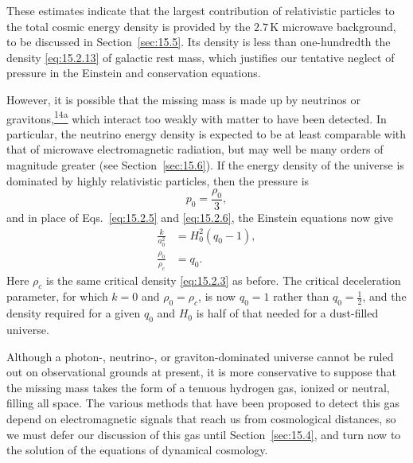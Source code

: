 These estimates indicate that the largest contribution of relativistic
particles to the total cosmic energy density is provided by the
\(2.7\,\mathrm{K}\) microwave background, to be discussed in
Section~\ref{sec:15.5}. Its density is less than one-hundredth the density
\eqref{eq:15.2.13} of galactic rest mass, which justifies our tentative
neglect of pressure in the Einstein and conservation equations.

However, it is possible that the missing mass is made up by neutrinos or
gravitons,\hyperref[ch15-ref-14a]{\textsuperscript{14a}} which interact too
weakly with matter to have been detected. In particular, the neutrino energy
density is expected to be at least comparable with that of microwave
electromagnetic radiation, but may well be many orders of magnitude greater
(see Section~\ref{sec:15.6}). If the energy density of the universe is
dominated by highly relativistic particles, then the pressure is
\begin{equation}
  p_0=\frac{\rho_0}{3},
  \tag{15.2.16}\label{eq:15.2.16}
\end{equation}
and in place of Eqs.~\eqref{eq:15.2.5} and \eqref{eq:15.2.6}, the Einstein
equations now give
\begin{align}
  \frac{k}{a_0^2}
  &=H_0^2(q_0-1),
  \tag{15.2.17}\label{eq:15.2.17}\\
  \frac{\rho_0}{\rho_c}
  &=q_0.
  \tag{15.2.18}\label{eq:15.2.18}
\end{align}
Here \(\rho_c\) is the same critical density \eqref{eq:15.2.3} as before.
The critical deceleration parameter, for which \(k=0\) and
\(\rho_0=\rho_c\), is now \(q_0=1\) rather than \(q_0=\tfrac12\), and the
density required for a given \(q_0\) and \(H_0\) is half of that needed for
a dust-filled universe.

Although a photon-, neutrino-, or graviton-dominated universe cannot be ruled
out on observational grounds at present, it is more conservative to suppose
that the missing mass takes the form of a tenuous hydrogen gas, ionized or
neutral, filling all space. The various methods that have been proposed to
detect this gas depend on electromagnetic signals that reach us from
cosmological distances, so we must defer our discussion of this gas until
Section~\ref{sec:15.4}, and turn now to the solution of the equations of
dynamical cosmology.
